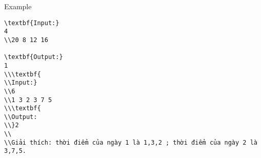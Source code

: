 Example  
\begin{verbatim}
\textbf{Input:}
4
\\20 8 12 16

\textbf{Output:}
1
\\\textbf{
\\Input:}
\\6
\\1 3 2 3 7 5
\\\textbf{
\\Output:
\\}2
\\
\\Giải thích: thời điểm của ngày 1 là 1,3,2 ; thời điểm của ngày 2 là 3,7,5.\end{verbatim}